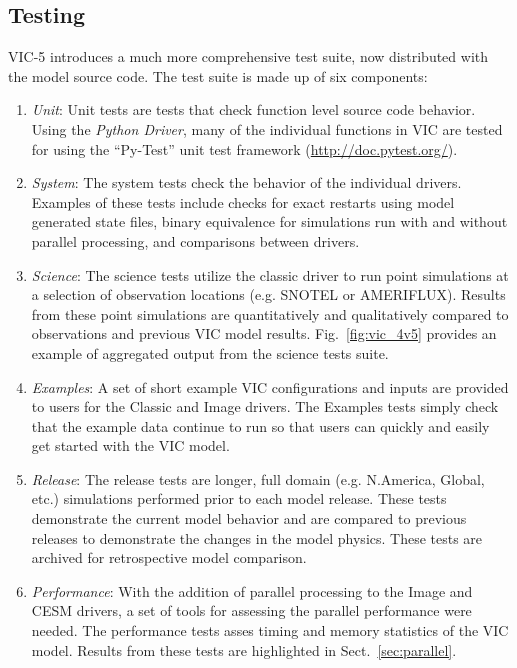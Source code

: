 \documentclass[gmd, manuscript]{copernicus}
\begin{document}
  \subsection{Testing}
    \label{sec:testing}
    VIC-5 introduces a much more comprehensive test suite, now distributed with the model source code. The test suite is made up of six components:

    \begin{enumerate}
      \item \textit{Unit}: Unit tests are tests that check function level source code behavior. Using the \textit{Python Driver}, many of the individual functions in VIC are tested for using the ``Py-Test'' unit test framework (\url{http://doc.pytest.org/}).

      \item \textit{System}: The system tests check the behavior of the individual drivers. Examples of these tests include checks for exact restarts using model generated state files, binary equivalence for simulations run with and without parallel processing, and comparisons between drivers.

      \item \textit{Science}: The science tests utilize the classic driver to run point simulations at a selection of observation locations (e.g. SNOTEL or AMERIFLUX). Results from these point simulations are quantitatively and qualitatively compared to observations and previous VIC model results. Fig.~\ref{fig:vic_4v5} provides an example of aggregated output from the science tests suite.

      \item \textit{Examples}: A set of short example VIC configurations and inputs are provided to users for the Classic and Image drivers. The Examples tests simply check that the example data continue to run so that users can quickly and easily get started with the VIC model.

      \item \textit{Release}: The release tests are longer, full domain (e.g. N.America, Global, etc.) simulations performed prior to each model release. These tests demonstrate the current model behavior and are compared to previous releases to demonstrate the changes in the model physics. These tests are archived for retrospective model comparison.

      \item \textit{Performance}: With the addition of parallel processing to the Image and CESM drivers, a set of tools for assessing the parallel performance were needed. The performance tests asses timing and memory statistics of the VIC model. Results from these tests are highlighted in Sect.~\ref{sec:parallel}.
    \end{enumerate}
\end{document}
